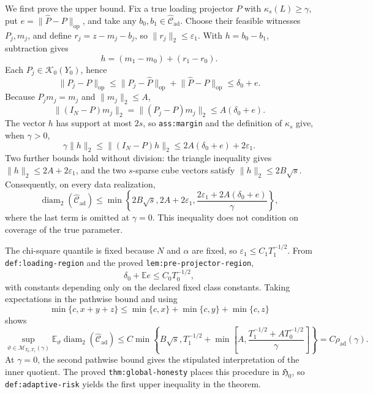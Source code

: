 We first prove the upper bound.  Fix a true loading projector \(P\) with \(\kappa_s(L)\ge\gamma\), put \(e=\lVert\widehat P-P\rVert_{\mathrm{op}}\), and take any \(b_0,b_1\in\widehat{\mathcal C}_{\mathrm{ad}}\).  Choose their feasible witnesses \(P_j,m_j\), and define \(r_j=z-m_j-b_j\), so \(\lVert r_j\rVert_2\le\varepsilon_1\).  With \(h=b_0-b_1\), subtraction gives
\[
 h=(m_1-m_0)+(r_1-r_0).
\]
Each \(P_j\in\mathcal K_0(Y_0)\), hence
\[
 \lVert P_j-P\rVert_{\mathrm{op}}
 \le\lVert P_j-\widehat P\rVert_{\mathrm{op}}
     +\lVert\widehat P-P\rVert_{\mathrm{op}}
 \le\delta_0+e.
\]
Because \(P_jm_j=m_j\) and \(\lVert m_j\rVert_2\le A\),
\[
 \lVert(I_N-P)m_j\rVert_2
 =\lVert(P_j-P)m_j\rVert_2
 \le A(\delta_0+e).
\]
The vector \(h\) has support at most \(2s\), so \texttt{ass:margin} and the definition of \(\kappa_s\) give, when \(\gamma>0\),
\[
 \gamma\lVert h\rVert_2
 \le\lVert(I_N-P)h\rVert_2
 \le2A(\delta_0+e)+2\varepsilon_1.
\]
Two further bounds hold without division: the triangle inequality gives \(\lVert h\rVert_2\le2A+2\varepsilon_1\), and the two \(s\)-sparse cube vectors satisfy \(\lVert h\rVert_2\le2B\sqrt s\).  Consequently, on every data realization,
\[
 \operatorname{diam}_2(\widehat{\mathcal C}_{\mathrm{ad}})
 \le\min\left\{2B\sqrt s, 2A+2\varepsilon_1,
 \frac{2\varepsilon_1+2A(\delta_0+e)}{\gamma}\right\},
\]
where the last term is omitted at \(\gamma=0\).  This inequality does not condition on coverage of the true parameter.

The chi-square quantile is fixed because \(N\) and \(\alpha\) are fixed, so \(\varepsilon_1\le C_1T_1^{-1/2}\).  From \texttt{def:loading-region} and the proved \texttt{lem:pre-projector-region},
\[
 \delta_0+\mathbb Ee\le C_0T_0^{-1/2},
\]
with constants depending only on the declared fixed class constants.  Taking expectations in the pathwise bound and using
\[
 \min\{c,x+y+z\}\le\min\{c,x\}+\min\{c,y\}+\min\{c,z\}
\]
shows
\[
 \sup_{\vartheta\in\mathcal M_{T_0,T_1}(\gamma)}
 \mathbb E_\vartheta\operatorname{diam}_2(\widehat{\mathcal C}_{\mathrm{ad}})
 \le C\min\left\{B\sqrt s, T_1^{-1/2}+
 \min\left[A,\frac{T_1^{-1/2}+AT_0^{-1/2}}{\gamma}\right]\right\}
 =C\rho_{\mathrm{ad}}(\gamma).
\]
At \(\gamma=0\), the second pathwise bound gives the stipulated interpretation of the inner quotient.  The proved \texttt{thm:global-honesty} places this procedure in \(\mathfrak H_0\), so \texttt{def:adaptive-risk} yields the first upper inequality in the theorem.

